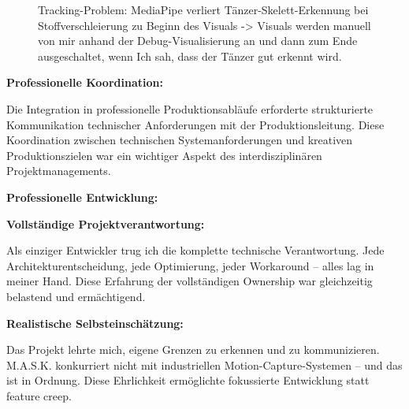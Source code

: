 \begin{figure}[htbp]
    \centering
    \caption{Tracking-Problem: MediaPipe verliert Tänzer-Skelett-Erkennung bei Stoffverschleierung zu Beginn des Visuals -> Visuals werden manuell von mir anhand der Debug-Visualisierung an und dann zum Ende ausgeschaltet, wenn Ich sah, dass der Tänzer gut erkennt wird.}
    \label{fig:cloth_tracking_issue}
\end{figure}

\textbf{Professionelle Koordination:}

\raggedright Die Integration in professionelle Produktionsabläufe erforderte strukturierte Kommunikation technischer Anforderungen mit der Produktionsleitung. Diese Koordination zwischen technischen Systemanforderungen und kreativen Produktionszielen war ein wichtiger Aspekt des interdisziplinären Projektmanagements.

\textbf{Professionelle Entwicklung:}

\textbf{Vollständige Projektverantwortung:}

\raggedright Als einziger Entwickler trug ich die komplette technische Verantwortung. Jede Architekturentscheidung, jede Optimierung, jeder Workaround – alles lag in meiner Hand. Diese Erfahrung der vollständigen Ownership war gleichzeitig belastend und ermächtigend.

\textbf{Realistische Selbsteinschätzung:}

\raggedright Das Projekt lehrte mich, eigene Grenzen zu erkennen und zu kommunizieren. M.A.S.K. konkurriert nicht mit industriellen Motion-Capture-Systemen – und das ist in Ordnung. Diese Ehrlichkeit ermöglichte fokussierte Entwicklung statt feature creep.

